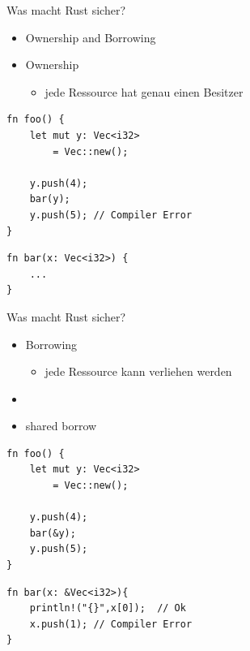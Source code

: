 \documentclass[12pt]{beamer}
\begin{document}
\begin{frame}[fragile=singleslide]{Was macht Rust sicher?}
	\begin{itemize}
	    \item Ownership and Borrowing
	\end{itemize}
	\begin{itemize}
	    \item Ownership
	    \begin{itemize}
	        \item jede Ressource hat genau einen Besitzer
	    \end{itemize}    
	\end{itemize}
\begin{center}
\hspace{3pt}
\begin{minipage}[t]{.47\textwidth}
\begin{lstlisting}
fn foo() {	
	let mut y: Vec<i32> 
		= Vec::new();
		
	y.push(4);	
	bar(y);	
	y.push(5); // Compiler Error	
}
\end{lstlisting}				
\end{minipage}
\hspace{3pt}
\begin{minipage}[t]{.47\textwidth}
\begin{lstlisting}
fn bar(x: Vec<i32>) {	
	...
}
\end{lstlisting}				
\end{minipage}
\end{center}
\end{frame}

\begin{frame}[fragile=singleslide]{Was macht Rust sicher?}
	\begin{itemize}
	    \item Borrowing
	    \begin{itemize}
	        \item jede Ressource kann verliehen werden
	    \end{itemize}
	    \item[]
	    \item shared borrow  
	\end{itemize}
\begin{center}
\hspace{3pt}
\begin{minipage}[t]{.47\textwidth}
\begin{lstlisting}
fn foo() {	
	let mut y: Vec<i32> 
		= Vec::new();
		
	y.push(4);	
	bar(&y);	
	y.push(5);	
}
\end{lstlisting}				
\end{minipage}
\hspace{3pt}
\begin{minipage}[t]{.47\textwidth}
\begin{lstlisting}
fn bar(x: &Vec<i32>){
	println!("{}",x[0]);  // Ok	
	x.push(1); // Compiler Error
}
\end{lstlisting}				
\end{minipage}
\end{center}
\end{frame}
\end{document}
